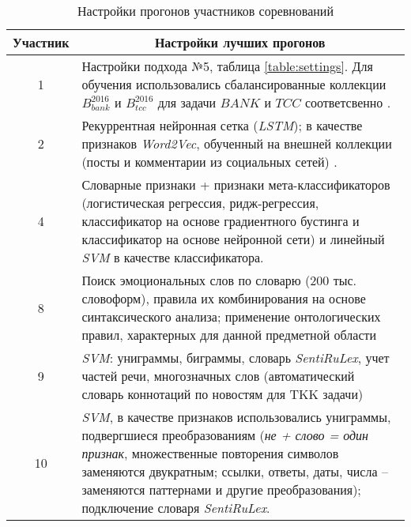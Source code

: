 \begin{table}[htp!]
\centering
\caption{Настройки прогонов участников соревнований}
\label{table:participants}
\begin{tabular}{cp{13.2cm}}
\hline
Участник        & \multicolumn{1}{|c}{Настройки лучших прогонов}                                                                                                                                                                                                                     \\ \hline
1               & Настройки подхода №5, таблица \ref{table:settings}. Для обучения использовались сбалансированные коллекции $B_{bank}^{2016}$ и $B_{tcc}^{2016}$ для задачи $BANK$ и $TCC$ соответсвенно \cite{myArticle}.                                                                                                                  \\
2               & Рекуррентная нейронная сетка ({\it LSTM}); в качестве признаков {\it Word2Vec}, обученный на внешней коллекции (посты и комментарии из социальных сетей) \cite{neuralNetworks}.                                                                                                                                            \\
4               & Словарные признаки + признаки мета-классификаторов (логистическая регрессия, ридж-регрессия, классификатор на основе градиентного бустинга и классификатор на основе нейронной сети) и линейный {\it SVM} в качестве классификатора.                                                                 \\
8               & Поиск эмоциональных слов по словарю (200 тыс. словоформ), правила их комбинирования на основе синтаксического анализа; применение онтологических правил, характерных для данной предметной области                                                                                                  \\
9               & {\it SVM}: униграммы, биграммы, словарь {\it SentiRuLex}, учет частей речи, многозначных слов (автоматический словарь коннотаций по новостям для TKK задачи)                                                                                                                                         \\
10              & {\it SVM}, в качестве признаков использовались униграммы, подвергшиеся преобразованиям ({\it не + слово = один признак}, множественные повторения символов заменяются двукратным; ссылки, ответы, даты, числа – заменяются паттернами и другие преобразования); подключение словаря {\it SentiRuLex}.\\ \hline
\end{tabular}
\end{table}

